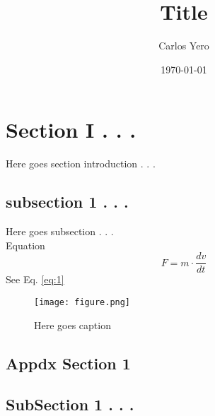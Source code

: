 \documentclass[11pt]{article}
\begin{document}
\title{\Large \bf{Title}}

\author{Carlos Yero}

\date{\today}
\maketitle



\section{Section I . . .}
Here goes section introduction . . .

\subsection{subsection 1 . . .}
Here goes subsection . . .
\\
Equation
\begin{equation}
  F = m\cdot\frac{dv}{dt}
  \label{eq:1}
\end{equation}
See Eq. \ref{eq:1}
\begin{figure}[h!]
  \centering
  \texttt{[image: figure.png]}
  \caption{Here goes caption}
  \label{fig:label}
\end{figure}


\newpage
\onecolumn



\newpage
\begin{appendices}
\appendix
\section{Appdx Section 1}
\subsection{SubSection 1 . . .}
\label{appendix:AppxA1}
\end{appendices}
\end{document}
